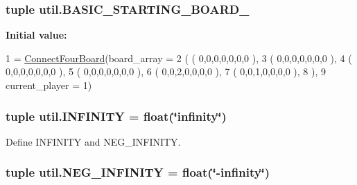 \subsubsection[{B\+A\+S\+I\+C\+\_\+\+S\+T\+A\+R\+T\+I\+N\+G\+\_\+\+B\+O\+A\+R\+D\+\_\+2}]{\setlength{\rightskip}{0pt plus 5cm}tuple util.\+B\+A\+S\+I\+C\+\_\+\+S\+T\+A\+R\+T\+I\+N\+G\+\_\+\+B\+O\+A\+R\+D\+\_}\label{namespaceutil_a70ced14d7bb5c7b954153b6b13c45781}
{\bfseries Initial value\+:}
\begin{DoxyCode}
1 = \hyperlink{classconnectfour_1_1_connect_four_board}{ConnectFourBoard}(board\_array =
2                                           ( ( 0,0,0,0,0,0,0 ),
3                                             ( 0,0,0,0,0,0,0 ),
4                                             ( 0,0,0,0,0,0,0 ),
5                                             ( 0,0,0,0,0,0,0 ),
6                                             ( 0,0,2,0,0,0,0 ),
7                                             ( 0,0,1,0,0,0,0 ),
8                                             ),
9                                           current\_player = 1)
\end{DoxyCode}
\hypertarget{namespaceutil_a7eb14c55451b00b740e7a1f68099e86d}{}
\subsubsection[{I\+N\+F\+I\+N\+I\+T\+Y}]{\setlength{\rightskip}{0pt plus 5cm}tuple util.\+I\+N\+F\+I\+N\+I\+T\+Y = float(\char`\"{}infinity\char`\"{})}\label{namespaceutil_a7eb14c55451b00b740e7a1f68099e86d}


Define \textquotesingle{}I\+N\+F\+I\+N\+I\+T\+Y\textquotesingle{} and \textquotesingle{}N\+E\+G\+\_\+\+I\+N\+F\+I\+N\+I\+T\+Y\textquotesingle{}. 

\hypertarget{namespaceutil_af395e63ea20fc9bb8466417c67280fc4}{}
\subsubsection[{N\+E\+G\+\_\+\+I\+N\+F\+I\+N\+I\+T\+Y}]{\setlength{\rightskip}{0pt plus 5cm}tuple util.\+N\+E\+G\+\_\+\+I\+N\+F\+I\+N\+I\+T\+Y = float(\char`\"{}-\/infinity\char`\"{})}\label{namespaceutil_af395e63ea20fc9bb8466417c67280fc4}
\hypertarget{namespaceutil_aeb1172b7a9311e22f027d739b689c080}{}
